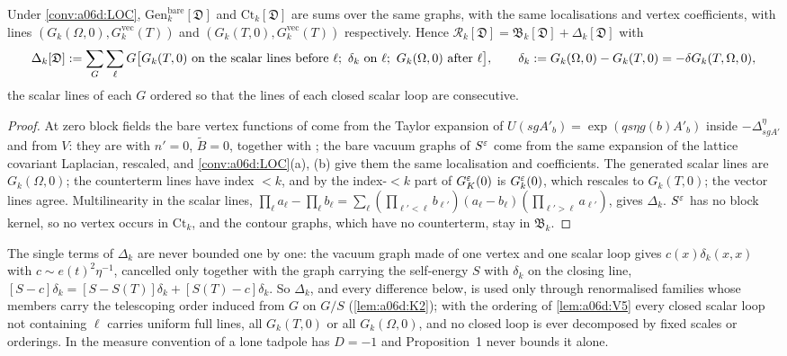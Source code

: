 \begin{lemma}\label{lem:a06d:V5}
Under \cref{conv:a06d:LOC}, $\mathrm{Gen}^{\mathrm{bare}}_k[\mathfrak D]$ and $\mathrm{Ct}_k[\mathfrak D]$ are sums over the same graphs, with the same localisations and vertex coefficients, with lines $(G_k(\Omega,0),G^{\mathrm{vec}}_k(T))$ and $(G_k(T,0),G^{\mathrm{vec}}_k(T))$ respectively. Hence $\mathcal R_k[\mathfrak D]=\mathfrak B_k[\mathfrak D]+\Delta_k[\mathfrak D]$ with
\[
\Delta_k[\mathfrak D]:=\sum_G\sum_\ell G\big[G_k(T,0)\text{ on the scalar lines before }\ell;\ \delta_k\text{ on }\ell;\ G_k(\Omega,0)\text{ after }\ell\big],\qquad\delta_k:= G_k(\Omega,0)-G_k(T,0)=-\delta G_k(T,\Omega,0),
\]
the scalar lines of each $G$ ordered so that the lines of each closed scalar loop are consecutive.
\end{lemma}

\begin{proof}
At zero block fields the bare vertex functions of \cite[(1.4)]{Ba3} come from the Taylor expansion of $U(sgA'_b)=\exp(qs\eta g(b)A'_b)$ inside $-\Delta^\eta_{sgA'}$ and from $V$: they are \cite[(1.8), (1.10)]{Ba3} with $n'=0$, $\tilde B=0$, together with \cite[(1.6), (1.7)]{Ba3}; the bare vacuum graphs of $S^{\varepsilon}$ \cite[p.~416]{Ba3} come from the same expansion of the lattice covariant Laplacian, rescaled, and \cref{conv:a06d:LOC}(a), (b) give them the same localisation and coefficients. The generated scalar lines are $G_k(\Omega,0)$; the counterterm lines have index $<k$, and by \cite[(1.27)]{Ba3} the index-$<k$ part of $G^{\varepsilon}_K(0)$ is $G^{\varepsilon}_k(0)$, which rescales to $G_k(T,0)$; the vector lines agree. Multilinearity in the scalar lines, $\prod_\ell a_\ell-\prod_\ell b_\ell=\sum_\ell(\prod_{\ell'<\ell}b_{\ell'})(a_\ell-b_\ell)(\prod_{\ell'>\ell}a_{\ell'})$, gives $\Delta_k$. $S^{\varepsilon}$ has no block kernel, so no vertex \cite[(1.13)--(1.15)]{Ba3} occurs in $\mathrm{Ct}_k$, and the contour graphs, which have no counterterm, stay in $\mathfrak B_k$.
\end{proof}

The single terms of $\Delta_k$ are never bounded one by one: the vacuum graph made of one \cite[(1.7)]{Ba3} vertex and one scalar loop gives $c(x)\delta_k(x,x)$ with $c\sim e(t)^2\eta^{-1}$, cancelled only together with the graph carrying the self-energy $S$ with $\delta_k$ on the closing line, $[S-c]\delta_k=[S-S(T)]\delta_k+[S(T)-c]\delta_k$. So $\Delta_k$, and every difference below, is used only through renormalised families whose members carry the telescoping order induced from $G$ on $G/S$ (\cref{lem:a06d:K2}); with the ordering of \cref{lem:a06d:V5} every closed scalar loop not containing $\ell$ carries uniform full lines, all $G_k(T,0)$ or all $G_k(\Omega,0)$, and no closed loop is ever decomposed by fixed scales or orderings. In the measure convention of \cite[(2.1)]{Ba3} a lone tadpole has $D=-1$ and Proposition~1 never bounds it alone.

